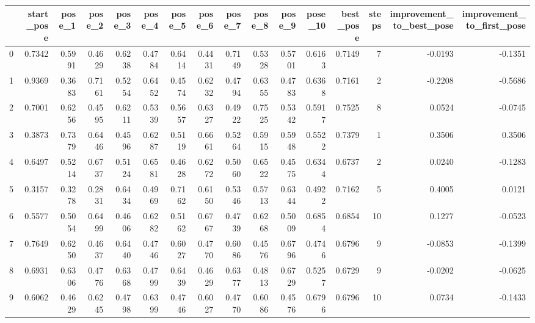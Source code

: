 \begin{tabular}{lrrrrrrrrrrrrrrr}
\toprule
{} &  start\_pose &  pose\_1 &  pose\_2 &  pose\_3 &  pose\_4 &  pose\_5 &  pose\_6 &  pose\_7 &  pose\_8 &  pose\_9 &  pose\_10 &  best\_pose &  steps &  improvement\_to\_best\_pose &  improvement\_to\_first\_pose \\
\midrule
0  &      0.7342 &  0.5991 &  0.4629 &  0.6238 &  0.4784 &  0.6414 &  0.4431 &  0.7149 &  0.5328 &  0.5701 &   0.6163 &     0.7149 &      7 &                   -0.0193 &                    -0.1351 \\
1  &      0.9369 &  0.3683 &  0.7161 &  0.5254 &  0.6452 &  0.4574 &  0.6232 &  0.4794 &  0.6355 &  0.4783 &   0.6368 &     0.7161 &      2 &                   -0.2208 &                    -0.5686 \\
2  &      0.7001 &  0.6256 &  0.4595 &  0.6211 &  0.5339 &  0.5657 &  0.6327 &  0.4922 &  0.7525 &  0.5342 &   0.5917 &     0.7525 &      8 &                    0.0524 &                    -0.0745 \\
3  &      0.3873 &  0.7379 &  0.6446 &  0.4596 &  0.6287 &  0.5119 &  0.6661 &  0.5264 &  0.5915 &  0.5948 &   0.5522 &     0.7379 &      1 &                    0.3506 &                     0.3506 \\
4  &      0.6497 &  0.5214 &  0.6737 &  0.5124 &  0.6581 &  0.4628 &  0.6272 &  0.5060 &  0.6522 &  0.4575 &   0.6344 &     0.6737 &      2 &                    0.0240 &                    -0.1283 \\
5  &      0.3157 &  0.3278 &  0.2831 &  0.6434 &  0.4969 &  0.7162 &  0.6150 &  0.5346 &  0.5713 &  0.6344 &   0.4922 &     0.7162 &      5 &                    0.4005 &                     0.0121 \\
6  &      0.5577 &  0.5054 &  0.6499 &  0.4606 &  0.6282 &  0.5162 &  0.6767 &  0.4739 &  0.6268 &  0.5009 &   0.6854 &     0.6854 &     10 &                    0.1277 &                    -0.0523 \\
7  &      0.7649 &  0.6250 &  0.4637 &  0.6440 &  0.4746 &  0.6027 &  0.4770 &  0.6086 &  0.4576 &  0.6796 &   0.4746 &     0.6796 &      9 &                   -0.0853 &                    -0.1399 \\
8  &      0.6931 &  0.6306 &  0.4776 &  0.6368 &  0.4799 &  0.6439 &  0.4629 &  0.6377 &  0.4813 &  0.6729 &   0.5257 &     0.6729 &      9 &                   -0.0202 &                    -0.0625 \\
9  &      0.6062 &  0.4629 &  0.6245 &  0.4798 &  0.6399 &  0.4746 &  0.6027 &  0.4770 &  0.6086 &  0.4576 &   0.6796 &     0.6796 &     10 &                    0.0734 &                    -0.1433 \\

\end{tabular}
